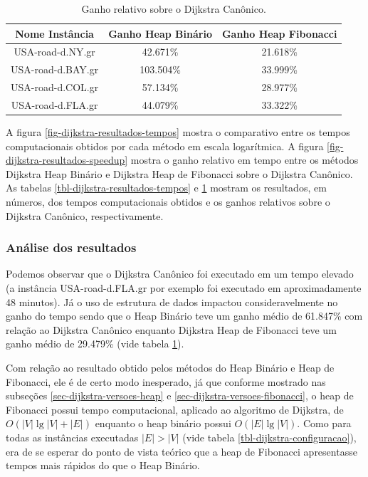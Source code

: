 \begin{table}[H]
\caption{Ganho relativo sobre o Dijkstra Canônico.}
\label{tbl-dijkstra-resultados-speedup}
\centering
\begin{adjustbox}{max width=\textwidth}
\begin{tabular}{|c|c|c|}
\hline
\textbf{Nome Instância} & \textbf{Ganho Heap Binário} & \textbf{Ganho Heap Fibonacci} \\ \hline
USA-road-d.NY.gr        & 42.671\%                       & 21.618\%                         \\ \hline
USA-road-d.BAY.gr       & 103.504\%                      & 33.999\%                         \\ \hline
USA-road-d.COL.gr       & 57.134\%                       & 28.977\%                         \\ \hline
USA-road-d.FLA.gr       & 44.079\%                       & 33.322\%                         \\ \hline
\end{tabular}
\end{adjustbox}
\end{table}

A figura \ref{fig-dijkstra-resultados-tempos} mostra o comparativo entre os tempos computacionais obtidos por cada método em escala logarítmica. A figura \ref{fig-dijkstra-resultados-speedup} mostra o ganho relativo em tempo entre os métodos Dijkstra Heap Binário e Dijkstra Heap de Fibonacci sobre o Dijkstra Canônico. As tabelas \ref{tbl-dijkstra-resultados-tempos} e \ref{tbl-dijkstra-resultados-speedup} mostram os resultados, em números, dos tempos computacionais obtidos e os ganhos relativos sobre o Dijkstra Canônico, respectivamente.

\subsubsection{Análise dos resultados}
\label{sec-dijkstra-experimentos-analise}
Podemos observar que o Dijkstra Canônico foi executado em um tempo elevado (a instância USA-road-d.FLA.gr por exemplo foi executado em aproximadamente 48 minutos). Já o uso de estrutura de dados impactou consideravelmente no ganho do tempo sendo que o Heap Binário teve um ganho médio de 61.847\% com relação ao Dijkstra Canônico enquanto Dijkstra Heap de Fibonacci teve um ganho médio de 29.479\% (vide tabela \ref{tbl-dijkstra-resultados-speedup}).

Com relação ao resultado obtido pelos métodos do Heap Binário e Heap de Fibonacci, ele é de certo modo inesperado, já que conforme mostrado nas subseções \ref{sec-dijkstra-versoes-heap} e \ref{sec-dijkstra-versoes-fibonacci}, o heap de Fibonacci possui tempo computacional, aplicado ao algoritmo de Dijkstra, de $O(|V|\lg |V| + |E|)$ enquanto o heap binário possui $O(|E| \lg |V|)$.  Como para todas as instâncias executadas $|E| > |V|$ (vide tabela \ref{tbl-dijkstra-configuracao}), era de se esperar do ponto de vista teórico que a heap de Fibonacci apresentasse tempos mais rápidos do que o Heap Binário.

